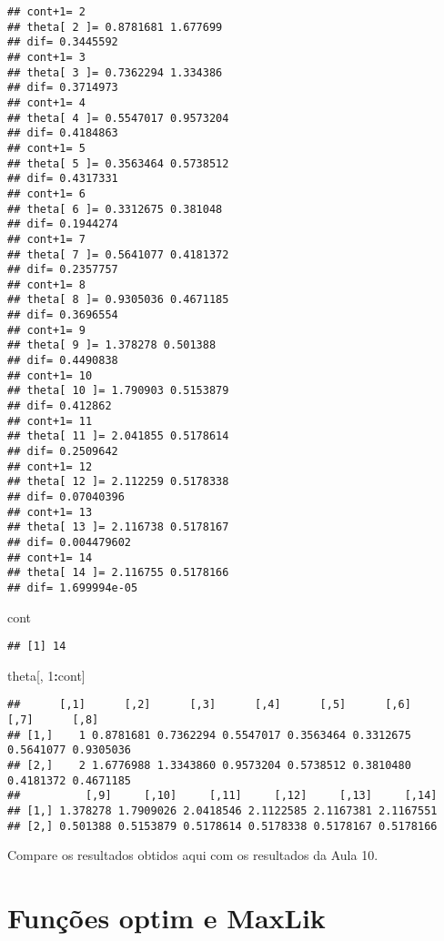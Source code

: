 \documentclass[
]{article}
\newenvironment{Shaded}{\begin{snugshade}}{\end{snugshade}}
\newcommand{\DecValTok}[1]{\textcolor[rgb]{0.00,0.00,0.81}{#1}}
\newcommand{\NormalTok}[1]{#1}
\newcommand{\SpecialCharTok}[1]{\textcolor[rgb]{0.81,0.36,0.00}{\textbf{#1}}}
\begin{document}
\begin{verbatim}
## cont+1= 2 
## theta[ 2 ]= 0.8781681 1.677699 
## dif= 0.3445592 
## cont+1= 3 
## theta[ 3 ]= 0.7362294 1.334386 
## dif= 0.3714973 
## cont+1= 4 
## theta[ 4 ]= 0.5547017 0.9573204 
## dif= 0.4184863 
## cont+1= 5 
## theta[ 5 ]= 0.3563464 0.5738512 
## dif= 0.4317331 
## cont+1= 6 
## theta[ 6 ]= 0.3312675 0.381048 
## dif= 0.1944274 
## cont+1= 7 
## theta[ 7 ]= 0.5641077 0.4181372 
## dif= 0.2357757 
## cont+1= 8 
## theta[ 8 ]= 0.9305036 0.4671185 
## dif= 0.3696554 
## cont+1= 9 
## theta[ 9 ]= 1.378278 0.501388 
## dif= 0.4490838 
## cont+1= 10 
## theta[ 10 ]= 1.790903 0.5153879 
## dif= 0.412862 
## cont+1= 11 
## theta[ 11 ]= 2.041855 0.5178614 
## dif= 0.2509642 
## cont+1= 12 
## theta[ 12 ]= 2.112259 0.5178338 
## dif= 0.07040396 
## cont+1= 13 
## theta[ 13 ]= 2.116738 0.5178167 
## dif= 0.004479602 
## cont+1= 14 
## theta[ 14 ]= 2.116755 0.5178166 
## dif= 1.699994e-05
\end{verbatim}

\begin{Shaded}
\begin{Highlighting}[]
\NormalTok{cont}
\end{Highlighting}
\end{Shaded}

\begin{verbatim}
## [1] 14
\end{verbatim}

\begin{Shaded}
\begin{Highlighting}[]
\NormalTok{theta[, }\DecValTok{1}\SpecialCharTok{:}\NormalTok{cont]}
\end{Highlighting}
\end{Shaded}

\begin{verbatim}
##      [,1]      [,2]      [,3]      [,4]      [,5]      [,6]      [,7]      [,8]
## [1,]    1 0.8781681 0.7362294 0.5547017 0.3563464 0.3312675 0.5641077 0.9305036
## [2,]    2 1.6776988 1.3343860 0.9573204 0.5738512 0.3810480 0.4181372 0.4671185
##          [,9]     [,10]     [,11]     [,12]     [,13]     [,14]
## [1,] 1.378278 1.7909026 2.0418546 2.1122585 2.1167381 2.1167551
## [2,] 0.501388 0.5153879 0.5178614 0.5178338 0.5178167 0.5178166
\end{verbatim}

Compare os resultados obtidos aqui com os resultados da Aula 10.

\hypertarget{funuxe7uxf5es-optim-e-maxlik}{%
\section{Funções optim e MaxLik}\label{funuxe7uxf5es-optim-e-maxlik}}
\end{document}
